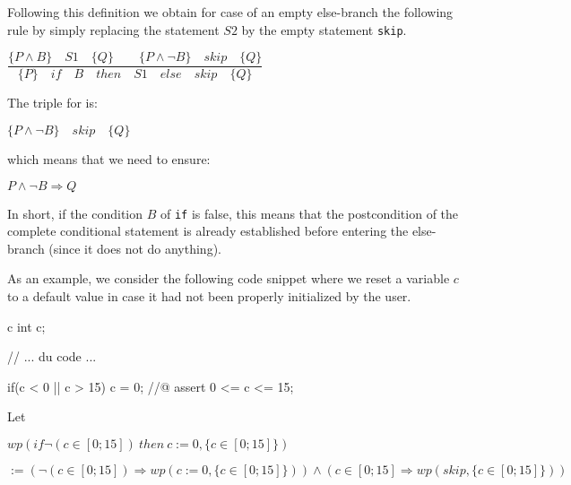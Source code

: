 \documentclass[middle]{zmdocument}
\begin{document}
Following this definition we obtain for case of an empty else-branch the
following rule by simply replacing the statement $S2$ by the empty
statement \texttt{skip}.




\begin{center}
$\dfrac{\{P \wedge B\}\quad S1\quad \{Q\} \quad \quad \{P \wedge \neg B\}\quad skip\quad \{Q\}}{\{P\}\quad if\quad B\quad then\quad S1\quad else\quad skip \quad \{Q\}}$


\end{center}


The triple for  is:




\begin{center}
$\{P \wedge \neg B\}\quad skip\quad \{Q\}$


\end{center}


which means that we need to ensure:




\begin{center}
$P \wedge \neg B \Rightarrow Q$


\end{center}


In short, if the condition $B$ of \texttt{if} is false, this means
that the postcondition of the complete conditional statement is already
established before entering the else-branch (since it does not do
anything).



As an example, we consider the following code snippet where we reset a
variable $c$ to a default value in case it had not been properly
initialized by the user.



\begin{CodeBlock}{c}
int c;

// ... du code ...

if(c < 0 || c > 15){
  c = 0;
}
//@ assert 0 <= c <= 15;
\end{CodeBlock}



Let



$wp(if \neg (c \in [0;15])\ then\ c := 0, \{c \in [0;15]\})$



$:= (\neg (c \in [0;15])\Rightarrow wp(c := 0, \{c \in [0;15]\})) \wedge (c \in [0;15]\Rightarrow wp(skip, \{c \in [0;15]\}))$
\end{document}
